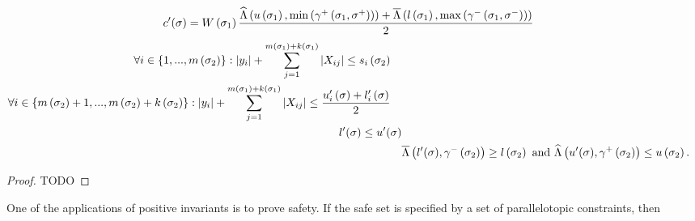 \begin{lemma}
\begin{align}
\begin{split}
& c^\prime(\sigma) = W\left(\sigma_{1}\right)\frac{\widehat{\Lambda}\left(u\left(\sigma_{1}\right),\min\left(\gamma^+\left(\sigma_{1},\sigma^+\right)\right)\right)+
\overline{\Lambda}\left(l\left(\sigma_{1}\right),\max\left(\gamma^-\left(\sigma_{1},\sigma^-\right)\right)\right)}{2}
\end{split}
\end{align}
\begin{align}
\begin{split}
& \forall i\in \{1,...,m\left(\sigma_{2}\right)\}:
 \left|y_i\right|+\sum_{j=1}^{m\left(\sigma_{1}\right)+k\left(\sigma_{1}\right)}\left|X_{ij}\right|\leq s_i\left(\sigma_{2}\right)
\end{split}\\
\begin{split}
& \forall i\in
\left\{m\left(\sigma_{2}\right)+1,...,m\left(\sigma_{2}\right)+k\left(\sigma_{2}\right)\right\}:
\left|y_i\right|+\sum_{j=1}^{m\left(\sigma_{1}\right)+k\left(\sigma_{1}\right)}\left|X_{ij}\right|\leq \frac{u^\prime_i\left(\sigma\right)+l^\prime_i\left(\sigma\right)}{2}
\end{split}\\
\begin{split}
l^\prime(\sigma)\leq u^\prime(\sigma)
\end{split}\\
& \overline{\Lambda}\left(l^\prime(\sigma),\gamma^-\left(\sigma_{2}\right)\right)\geq
l\left(\sigma_{2}\right)~\text{and}~\widehat{\Lambda}\left(u^\prime(\sigma),\gamma^+\left(\sigma_{2}\right)\right)\leq u\left(\sigma_{2}\right).
\end{align}
\end{lemma}
\begin{proof}
{\color{red} TODO}
\end{proof}

One of the applications of positive invariants is to prove safety.  If
the safe set is specified by a set of parallelotopic constraints, then 
